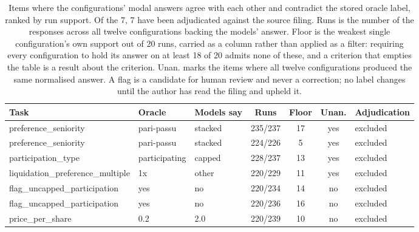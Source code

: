 \begin{table}[t]
\centering
\footnotesize
\setlength{\tabcolsep}{4pt}
\begin{tabular}{l l l c S[table-format=2.0] c l}
\toprule
Task & Oracle & Models say & Runs & {Floor} & Unan. & Adjudication \\
\midrule
preference\_seniority & pari-passu & stacked & 235/237 & 17 & yes & excluded \\
preference\_seniority & pari-passu & stacked & 224/226 & 5 & yes & excluded \\
participation\_type & participating & capped & 228/237 & 13 & yes & excluded \\
liquidation\_preference\_multiple & 1x & other & 220/229 & 11 & yes & excluded \\
flag\_uncapped\_participation & yes & no & 220/234 & 14 & no & excluded \\
flag\_uncapped\_participation & yes & no & 220/236 & 16 & no & excluded \\
price\_per\_share & 0.2 & 2.0 & 220/239 & 10 & no & excluded \\
\bottomrule
\end{tabular}
\caption{Items where the configurations' modal answers agree with each other and contradict the stored oracle label, ranked by run support. Of the 7, 7 have been adjudicated against the source filing. Runs is the number of the responses across all twelve configurations backing the models' answer. Floor is the weakest single configuration's own support out of 20 runs, carried as a column rather than applied as a filter: requiring every configuration to hold its answer on at least 18 of 20 admits none of these, and a criterion that empties the table is a result about the criterion. Unan. marks the items where all twelve configurations produced the same normalised answer. A flag is a candidate for human review and never a correction; no label changes until the author has read the filing and upheld it.}
\label{tab:flags}
\end{table}
